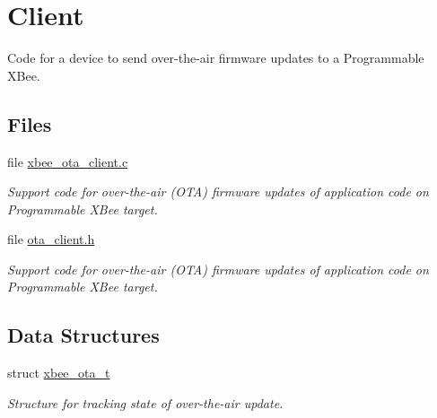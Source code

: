 \hypertarget{group__xbee__ota__client}{}\section{Client}
\label{group__xbee__ota__client}


\begin{DoxyVerb}     Code for a device to send over-the-air firmware updates to a
     Programmable XBee.\end{DoxyVerb}
  


\subsection*{Files}
\begin{DoxyCompactItemize}
\item 
file \hyperlink{xbee__ota__client_8c}{xbee\+\_\+ota\+\_\+client.\+c}
\begin{DoxyCompactList}\small\item\em Support code for over-\/the-\/air (O\+TA) firmware updates of application code on Programmable X\+Bee target. \end{DoxyCompactList}\item 
file \hyperlink{ota__client_8h}{ota\+\_\+client.\+h}
\begin{DoxyCompactList}\small\item\em Support code for over-\/the-\/air (O\+TA) firmware updates of application code on Programmable X\+Bee target. \end{DoxyCompactList}\end{DoxyCompactItemize}
\subsection*{Data Structures}
\begin{DoxyCompactItemize}
\item 
struct \hyperlink{structxbee__ota__t}{xbee\+\_\+ota\+\_\+t}
\begin{DoxyCompactList}\small\item\em Structure for tracking state of over-\/the-\/air update. \end{DoxyCompactList}\end{DoxyCompactItemize}
